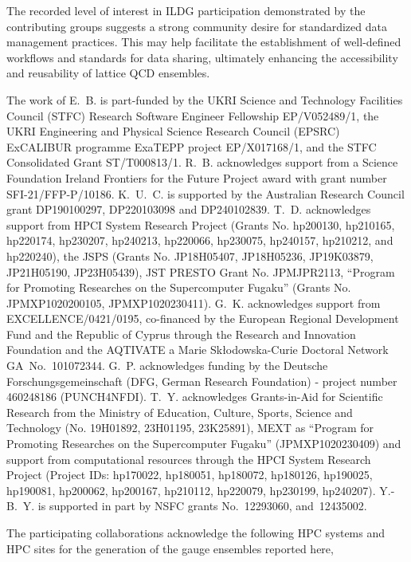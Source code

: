 \documentclass[a4paper,11pt]{article}
\begin{document}
The recorded level of interest in ILDG participation demonstrated by
the contributing groups suggests a strong community desire for
standardized data management practices. This may help facilitate the
establishment of well-defined workflows and standards for data
sharing, ultimately enhancing the accessibility and reusability of
lattice QCD ensembles.

\acknowledgments

The work of E.~B. is part-funded by the UKRI Science and Technology
Facilities Council (STFC) Research Software Engineer Fellowship
EP/V052489/1, the UKRI Engineering and Physical Science Research
Council (EPSRC) ExCALIBUR programme ExaTEPP project EP/X017168/1, and
the STFC Consolidated Grant ST/T000813/1. R.~B. acknowledges support
from a Science Foundation Ireland Frontiers for the Future Project
award with grant number SFI-21/FFP-P/10186. K.~U.~C. is supported by
the Australian Research Council grant DP190100297, DP220103098 and
DP240102839. T.~D. acknowledges support from HPCI System Research
Project (Grants No. hp200130, hp210165, hp220174, hp230207, hp240213,
hp220066, hp230075, hp240157, hp210212, and hp220240), the JSPS
(Grants No. JP18H05407, JP18H05236, JP19K03879, JP21H05190,
JP23H05439), JST PRESTO Grant No. JPMJPR2113, ``Program for Promoting
Researches on the Supercomputer Fugaku'' (Grants No. JPMXP1020200105,
JPMXP1020230411). G.~K. acknowledges support from
EXCELLENCE/0421/0195, co-financed by the European Regional Development
Fund and the Republic of Cyprus through the Research and Innovation
Foundation and the AQTIVATE a Marie Sk\l{}odowska-Curie Doctoral
Network GA~No.~101072344.  G.~P. acknowledges funding by the Deutsche
Forschungsgemeinschaft (DFG, German Research Foundation) - project
number 460248186 (PUNCH4NFDI). T.~Y.  acknowledges Grants-in-Aid for
Scientific Research from the Ministry of Education, Culture, Sports,
Science and Technology (No. 19H01892, 23H01195, 23K25891), MEXT as
``Program for Promoting Researches on the Supercomputer Fugaku''
(JPMXP1020230409) and support from computational resources through the
HPCI System Research Project (Project IDs: hp170022, hp180051,
hp180072, hp180126, hp190025, hp190081, hp200062, hp200167, hp210112,
hp220079, hp230199, hp240207). Y.-B.~Y. is supported in part by NSFC
grants No.~12293060, and~12435002.

The participating collaborations acknowledge the following HPC systems
and HPC sites for the generation of the gauge ensembles reported here,
\end{document}

